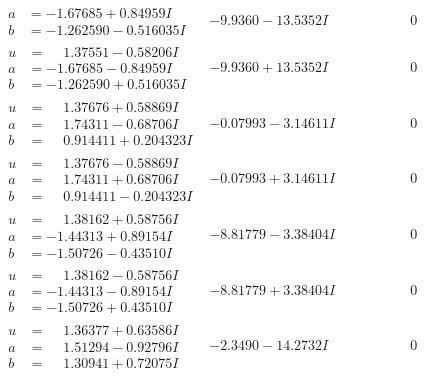 \documentclass[1p]{elsarticle_modified}
\theoremstyle{definition}
\begin{document}
$$\begin{array}{c|c|c}
\begin{aligned}
a &= -1.67685 + 0.84959 I \\
b &= -1.262590 - 0.516035 I\end{aligned}
 & -9.9360 - 13.5352 I & \phantom{-0.000000 } 0 \\ \hline\begin{aligned}
u &= \phantom{-}1.37551 - 0.58206 I \\
a &= -1.67685 - 0.84959 I \\
b &= -1.262590 + 0.516035 I\end{aligned}
 & -9.9360 + 13.5352 I & \phantom{-0.000000 } 0 \\ \hline\begin{aligned}
u &= \phantom{-}1.37676 + 0.58869 I \\
a &= \phantom{-}1.74311 - 0.68706 I \\
b &= \phantom{-}0.914411 + 0.204323 I\end{aligned}
 & -0.07993 - 3.14611 I & \phantom{-0.000000 } 0 \\ \hline\begin{aligned}
u &= \phantom{-}1.37676 - 0.58869 I \\
a &= \phantom{-}1.74311 + 0.68706 I \\
b &= \phantom{-}0.914411 - 0.204323 I\end{aligned}
 & -0.07993 + 3.14611 I & \phantom{-0.000000 } 0 \\ \hline\begin{aligned}
u &= \phantom{-}1.38162 + 0.58756 I \\
a &= -1.44313 + 0.89154 I \\
b &= -1.50726 - 0.43510 I\end{aligned}
 & -8.81779 - 3.38404 I & \phantom{-0.000000 } 0 \\ \hline\begin{aligned}
u &= \phantom{-}1.38162 - 0.58756 I \\
a &= -1.44313 - 0.89154 I \\
b &= -1.50726 + 0.43510 I\end{aligned}
 & -8.81779 + 3.38404 I & \phantom{-0.000000 } 0 \\ \hline\begin{aligned}
u &= \phantom{-}1.36377 + 0.63586 I \\
a &= \phantom{-}1.51294 - 0.92796 I \\
b &= \phantom{-}1.30941 + 0.72075 I\end{aligned}
 & -2.3490 - 14.2732 I & \phantom{-0.000000 } 0 \\ \hline\begin{aligned}

\end{aligned}
\end{array}$$
\end{document}
